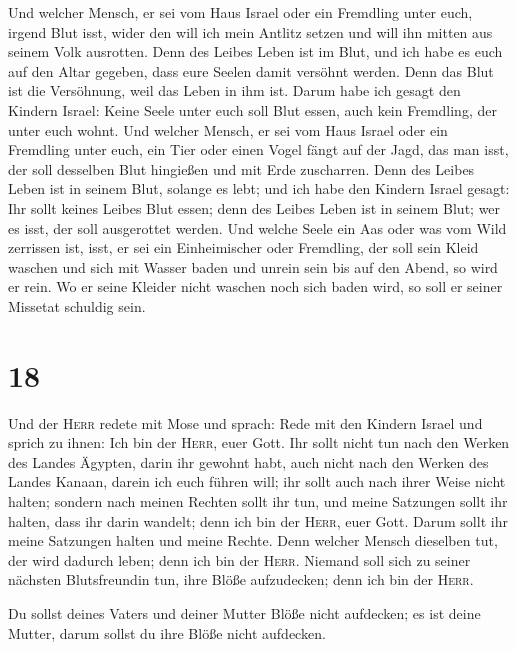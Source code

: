  Und welcher Mensch, er sei vom Haus Israel oder ein
Fremdling unter euch, irgend Blut isst, wider den will ich mein Antlitz
setzen und will ihn mitten aus seinem Volk ausrotten. 
Denn des Leibes Leben ist im Blut, und ich habe es euch auf den Altar
gegeben, dass eure Seelen damit versöhnt werden. Denn das Blut ist die
Versöhnung, weil das Leben in ihm ist.  Darum habe ich
gesagt den Kindern Israel: Keine Seele unter euch soll Blut essen, auch
kein Fremdling, der unter euch wohnt.  Und welcher
Mensch, er sei vom Haus Israel oder ein Fremdling unter euch, ein Tier
oder einen Vogel fängt auf der Jagd, das man isst, der soll desselben
Blut hingießen und mit Erde zuscharren.  Denn des Leibes
Leben ist in seinem Blut, solange es lebt; und ich habe den Kindern
Israel gesagt: Ihr sollt keines Leibes Blut essen; denn des Leibes Leben
ist in seinem Blut; wer es isst, der soll ausgerottet werden.
 Und welche Seele ein Aas oder was vom Wild zerrissen
ist, isst, er sei ein Einheimischer oder Fremdling, der soll sein Kleid
waschen und sich mit Wasser baden und unrein sein bis auf den Abend, so
wird er rein.  Wo er seine Kleider nicht waschen noch
sich baden wird, so soll er seiner Missetat schuldig sein.

\hypertarget{section-17}{%
\section{18}\label{section-17}}

 Und der \textsc{Herr} redete mit Mose und sprach:
 Rede mit den Kindern Israel und sprich zu ihnen: Ich bin
der \textsc{Herr}, euer Gott.  Ihr sollt nicht tun nach
den Werken des Landes Ägypten, darin ihr gewohnt habt, auch nicht nach
den Werken des Landes Kanaan, darein ich euch führen will; ihr sollt
auch nach ihrer Weise nicht halten;  sondern nach meinen
Rechten sollt ihr tun, und meine Satzungen sollt ihr halten, dass ihr
darin wandelt; denn ich bin der \textsc{Herr}, euer Gott. 
Darum sollt ihr meine Satzungen halten und meine Rechte. Denn welcher
Mensch dieselben tut, der wird dadurch leben; denn ich bin der
\textsc{Herr}.  Niemand soll sich zu seiner nächsten
Blutsfreundin tun, ihre Blöße aufzudecken; denn ich bin der
\textsc{Herr}.

 Du sollst deines Vaters und deiner Mutter Blöße nicht
aufdecken; es ist deine Mutter, darum sollst du ihre Blöße nicht
aufdecken.

